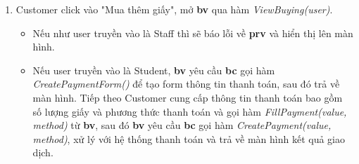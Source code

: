\begin{enumerate} [1. ]
    \item Customer click vào "Mua thêm giấy", mở \textbf{bv} qua hàm \textit{ViewBuying(user)}. 
    \begin{itemize}
        \item Nếu như user truyền vào là Staff thì sẽ báo lỗi về \textbf{prv} và hiển thị lên màn hình.
        \item Nếu user truyền vào là Student, \textbf{bv} yêu cầu \textbf{bc} gọi hàm \textit{CreatePaymentForm()} để tạo form thông tin thanh toán, sau đó trả về màn hình. Tiếp theo Customer cung cấp thông tin thanh toán bao gồm số lượng giấy và phương thức thanh toán và gọi hàm \textit{FillPayment(value, method)} từ \textbf{bv}, sau đó \textbf{bv} yêu cầu \textbf{bc} gọi hàm \textit{CreatePayment(value, method)}, xử lý với hệ thống thanh toán và trả về màn hình kết quả giao dịch.
    \end{itemize}


\end{enumerate}
